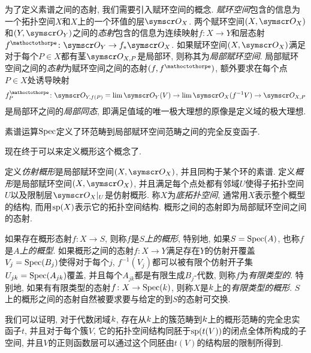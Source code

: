 为了定义素谱之间的态射, 我们需要引入赋环空间的概念. \emph{赋环空间}包含的信息为一个拓扑空间$X$和$X$上的一个环值的层$\OO_X$. 两个赋环空间$(X, \OO_X)$和$(Y, \OO_Y)$之间的\emph{态射}包含的信息为连续映射$f\colon X\to Y$和层态射$f^\mathoctothorpe\colon \OO_Y\to f_*\OO_X$. 如果赋环空间$(X, \OO_X)$满足对于每个$P\in X$都有茎$\OO_{X, P}$是局部环, 则称其为\emph{局部赋环空间}. 局部赋环空间之间的\emph{态射}为赋环空间之间的态射$(f, f^\mathoctothorpe)$, 额外要求在每个点$P\in X$处诱导映射
\begin{equation*}
  f^\mathoctothorpe_P\colon \OO_{Y, f(P)}=\dlim \OO_Y(V)\to \dlim\OO_X (f^{-1}V) \to \OO_{X, P}
\end{equation*}
是局部环之间的\emph{局部同态}, 即满足值域的唯一极大理想的原像是定义域的极大理想.

\begin{propositionnoproof}
  素谱运算$\Spec$定义了环范畴到局部赋环空间范畴之间的完全反变函子.
\end{propositionnoproof}

现在终于可以来定义概形这个概念了.

\begin{definition}
  定义\emph{仿射概形}是局部赋环空间$(X, \OO_X)$, 并且同构于某个环的素谱. 定义\emph{概形}是局部赋环空间$(X, \OO_X)$, 并且满足每个点处都有邻域$U$使得子拓扑空间$U$以及限制层$\OO_X\restrict{U}$是仿射概形. 称$X$为\emph{底拓扑空间}, 通常用$X$表示整个概型的结构, 而用$\sp (X)$表示它的拓扑空间结构. 概形之间的态射即为局部赋环空间之间的态射.
\end{definition}

如果存在概形态射$f\colon X\to S$, 则称$f$是$S$\emph{上的概形}, 特别地, 如果$S=\Spec (A)$, 也称$f$是$A$\emph{上的概型}. 如果概形之间的态射$f\colon X\to Y$满足存在$Y$的仿射开覆盖$V_j=\Spec (B_j)$使得对于每个$j$, $f^{-1}(V_j)$都可以被有限个仿射开子集$U_{jk}=\Spec (A_{jk})$覆盖, 并且每个$A_{jk}$都是有限生成$B_j$-代数, 则称$f$为\emph{有限类型的}. 特别地, 如果有有限类型的态射$f\colon X\to \Spec (\kk)$, 则称$X$是$\kk$上的\emph{有限类型的概形}. $S$上的概形之间的态射自然被要求要与给定的到$S$的态射可交换.

我们可以证明, 对于代数闭域$\kk$, 存在从$\kk$上的簇范畴到$\kk$上的概形范畴的完全忠实函子$t$, 并且对于每个簇$V$, 它的拓扑空间结构同胚于$\sp (t(V))$的闭点全体所构成的子空间, 并且$V$的正则函数层可以通过这个同胚由$t(V)$的结构层的限制所得到\parencite[78, Proposition 2.6]{hartshorne_algebraic_1977}.


